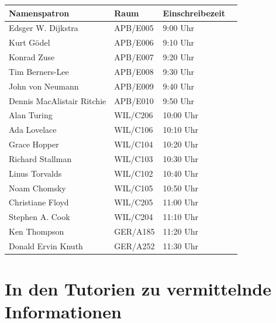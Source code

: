 \documentclass[a4paper,12pt]{report}
\begin{document}
\begin{center}
\vspace{1cm}
\begin{tabular}[h]{|l|l|l|l|}
	\hline
	\textbf{Namenspatron} & \textbf{Raum}& \textbf{Einschreibezeit}\\ \hline
	Edsger W. Dijkstra & APB/E005 & 9:00 Uhr\\
	Kurt Gödel & APB/E006 & 9:10 Uhr\\
	Konrad Zuse & APB/E007 & 9:20 Uhr\\
	Tim Berners-Lee & APB/E008 & 9:30 Uhr\\
	John von Neumann & APB/E009 & 9:40 Uhr\\
	Dennis MacAlistair Ritchie & APB/E010 & 9:50 Uhr\\
	Alan Turing & WIL/C206 & 10:00 Uhr\\
	Ada Lovelace & WIL/C106 & 10:10 Uhr\\
	Grace Hopper & WIL/C104 & 10:20 Uhr\\
	Richard Stallman & WIL/C103 & 10:30 Uhr\\
	Linus Torvalds & WIL/C102 & 10:40 Uhr\\
	Noam Chomsky & WIL/C105 & 10:50 Uhr\\
	Christiane Floyd & WIL/C205 & 11:00 Uhr\\
	Stephen A. Cook & WIL/C204 & 11:10 Uhr\\
	Ken Thompson & GER/A185 & 11:20 Uhr\\
	Donald Ervin Knuth & GER/A252 & 11:30 Uhr\\
	\hline
\end{tabular}
\end{center}

\chapter{In den Tutorien zu vermittelnde Informationen}
\end{document}
